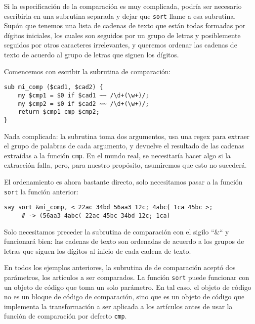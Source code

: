 Si la especificación de la comparación es muy complicada,
podría ser necesario escribirla en una subrutina separada
y dejar que {\tt sort} llame a esa subrutina. Supón que 
tenemos una lista de cadenas de texto que están todas formadas
por dígitos iniciales, los cuales son seguidos por un grupo
de letras y posiblemente seguidos por otros caracteres irrelevantes,
y queremos ordenar las cadenas de texto de acuerdo al grupo de
letras que siguen los dígitos.

Comencemos con escribir la subrutina de comparación:


\begin{lstlisting}
sub mi_comp ($cad1, $cad2) {
    my $cmp1 = $0 if $cad1 ~~ /\d+(\w+)/; 
    my $cmp2 = $0 if $cad2 ~~ /\d+(\w+)/; 
    return $cmp1 cmp $cmp2;
}
\end{lstlisting}

Nada complicada: la subrutina toma dos argumentos, usa
una regex para extraer el grupo de palabras de cada 
argumento, y devuelve el resultado de las cadenas 
extraídas a la función {\tt cmp}. En el mundo real,
se necesitaría hacer algo si la extracción falla, pero,
para nuestro propósito, asumiremos que esto no sucederá.

El ordenamiento es ahora bastante directo, solo 
necesitamos pasar a la función {\tt sort} la
función anterior:

\begin{lstlisting}
say sort &mi_comp, < 22ac 34bd 56aa3 12c; 4abc( 1ca 45bc >;
     # -> (56aa3 4abc( 22ac 45bc 34bd 12c; 1ca)
\end{lstlisting}

Solo necesitamos preceder la subrutina de comparación
con el sigilo ``\&`` y funcionará bien: las cadenas de texto
son ordenadas de acuerdo a los grupos de letras que siguen los
dígitos al inicio de cada cadena de texto.

En todos los ejemplos anteriores, la subrutina de
de comparación aceptó dos parámetros, los artículos
a ser comparados. La función {\tt sort} puede funcionar
con un objeto de código que toma un solo parámetro. En 
tal caso, el objeto de código no es un bloque 
de código de comparación, sino que es un objeto de código
que implementa la transformación a ser aplicada a los
artículos antes de usar la función de comparación por
defecto {\tt cmp}. 

